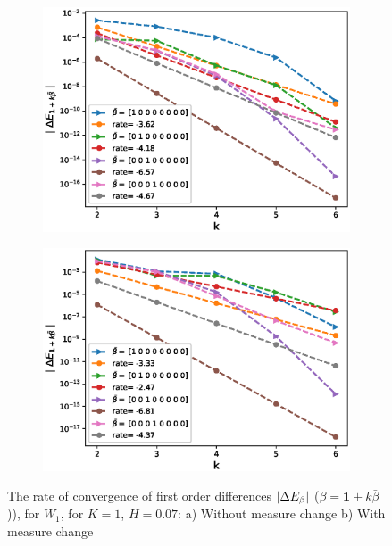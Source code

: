 \documentclass[11pt]{article}
\begin{document}
\begin{figure}[h!]
	\centering
	\begin{subfigure}{.45\textwidth}
		\centering
		\includegraphics[width=1\linewidth]{./figures/rBergomi_mixed_error_rates/without_change_measure/N_4/H_007/first_difference_rbergomi_4steps_H_007_K_1_totally_hierarch_with_rate_W1}
		\caption{}
		\label{fig:sub3}
	\end{subfigure}%
	\begin{subfigure}{.45\textwidth}
		\centering
		\includegraphics[width=1\linewidth]{./figures/rBergomi_mixed_error_rates/partial_change_measure/N_4/H_007/first_difference_rbergomi_4steps_H_007_K_1_totally_hierarch_with_rate_W1_change_measure_part_spec}
		\caption{}
		\label{fig:sub4}
	\end{subfigure}
	
	\caption{The rate of convergence of  first order differences $\left\lvert\Delta E_{\beta}\right\rvert$ ($\beta=\mathbf{1}+k \bar{\beta}$)), for $W_1$, for $K=1$, $H=0.07$: a) Without measure change b) With measure change}
	\label{fig:first_diff_comp_K_1_H_007_W_1}
\end{figure}
\end{document}
